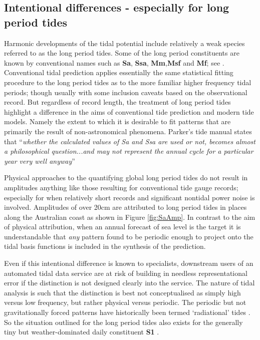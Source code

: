 \subsection{Intentional differences - especially for long period tides}
Harmonic developments of the tidal potential include relatively a weak species referred to as the long period tides.  Some of the long period constituents are known by conventional names such as \textbf{Sa}, \textbf{Ssa}, \textbf{Mm},\textbf{Msf} and \textbf{Mf}; see \citep[table 4] {10.1016/b978-0-444-53802-4.00058-0}.
Conventional tidal prediction applies essentially the same statistical fitting procedure to the long period tides as to the more familiar higher frequency tidal periods; though usually with some inclusion caveats based on the observational record. 
But regardless of record length, the treatment of long period tides highlight a difference in the aims of conventional tide prediction and modern tide models.   Namely the extent to which it is desirable to fit patterns that are primarily the result of non-astronomical phenomena.
Parker's tide manual states that ``\textit{whether the calculated values of Sa and Ssa are used or not, becomes almost a philosophical question...and may not represent the annual cycle for a particular year very well anyway}''  \citep[Section 3.7]{Parker:2007wq} 

Physical approaches to the quantifying global long period tides \citep{Egbert:1994wz} do not result in amplitudes anything like those resulting for conventional tide gauge records; especially for when relatively short records and significant nontidal power noise is involved.   Amplitudes of over 20cm are attributed to long period tides in places along the Australian coast as shown in Figure \ref{fig:SaAmp}. In contrast to the aim of physical attribution, when an annual forecast of sea level is the target it is understandable that \textit{any} pattern found to be periodic enough to project onto the tidal basis functions is included in the synthesis of the prediction. 

Even if this intentional difference is known to specialists, downstream users of an automated tidal data service are at risk of building in needless representational error if the distinction is not designed clearly into the service.
The nature of tidal analysis is such that the distinction is best not conceptualised as simply high versus low frequency, but rather physical versus periodic.   The periodic but not gravitationally forced patterns have historically been termed `radiational' tides \citep{10.1016/b978-0-444-53802-4.00058-0}.  So the situation outlined for the long period tides also exists for the generally tiny but weather-dominated daily constituent \textbf{S1} \citep{Ray:2004ts}.
 

